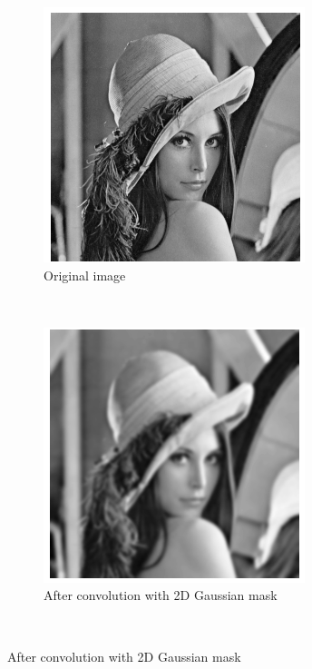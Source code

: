 \begin{figure}
		    \begin{subfigure}[b]{0.3\textwidth}
		        \includegraphics[width=\textwidth]{images/lena_orig.png}
		        \caption{Original image}
		    \end{subfigure}
		    ~ %
		    \begin{subfigure}[b]{0.3\textwidth}
		        \includegraphics[width=\textwidth]{images/lena_smooth.png}
		        \caption{After convolution with 2D Gaussian mask}
		    \end{subfigure}
		    ~ %


\end{figure}

